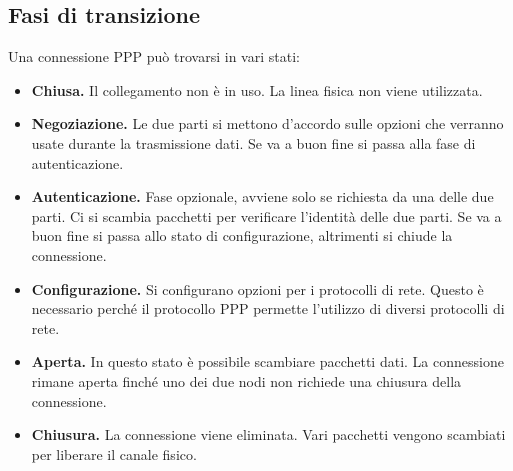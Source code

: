         \subsection{Fasi di transizione}
            Una connessione PPP può trovarsi in vari stati:
            \begin{itemize}
                \item \textbf{Chiusa.} Il collegamento non è in uso. La linea fisica non viene utilizzata.
                
                \item \textbf{Negoziazione.}  Le due parti si mettono d'accordo sulle opzioni che verranno usate durante la trasmissione dati. Se va a buon fine si passa alla fase di autenticazione.
                
                \item \textbf{Autenticazione.} Fase opzionale, avviene solo se richiesta da una delle due parti. Ci si scambia pacchetti per verificare l'identità delle due parti. Se va a buon fine si passa allo stato di configurazione, altrimenti si chiude la connessione.
                
                \item \textbf{Configurazione.} Si configurano opzioni per i protocolli di rete. Questo è necessario perché il protocollo PPP permette l'utilizzo di diversi protocolli di rete.
                
                \item \textbf{Aperta.} In questo stato è possibile scambiare pacchetti dati. La connessione rimane aperta finché uno dei due nodi non richiede una chiusura della connessione.
                
                \item \textbf{Chiusura.} La connessione viene eliminata. Vari pacchetti vengono scambiati per liberare il canale fisico.
            \end{itemize}